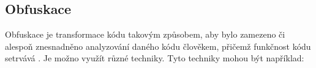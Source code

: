 \subsection{Obfuskace}
\label{obfuskacni_metody}

Obfuskace je transformace kódu takovým způsobem, aby bylo zamezeno či alespoň znesnadněno analyzování daného kódu člověkem, přičemž funkčnost kódu setrvává \cite{13355040520180901} \cite{Obfuscation}. Je možno využít různé techniky. Tyto techniky mohou být například: 



